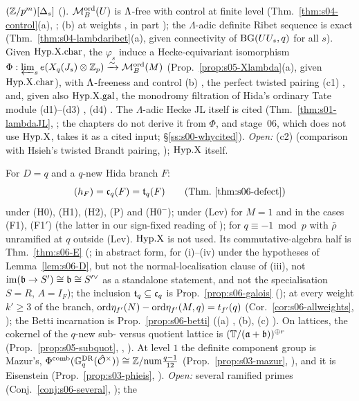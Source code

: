 \begin{description}[leftmargin=0pt,itemsep=4pt]
  $(\mathbb{Z}/p^m)[\Delta_s]$ (). $\mathcal{M}^{\mathrm{ord}}_B(U)$ is $\Lambda$-free with control at finite level
  (Thm.~\ref{thm:s04-control}(a), \stproved; (b) at weights \stcited, in part \stexp); the $\Lambda$-adic definite Ribet sequence is
  exact (Thm.~\ref{thm:s04-lambdaribet}(a), \stproved{} given connectivity of $\mathrm{BG}(UU_s,q)$ for all $s$). Given $\mathrm{Hyp.X.char}$, the
  $\varphi_s$ induce a Hecke-equivariant isomorphism $\Phi:\varprojlim_se(X_q(J_s)\otimes\mathbb{Z}_p)\xrightarrow\sim\mathcal{M}^{\mathrm{ord}}_B(M)$
  (Prop.~\ref{prop:s05-Xlambda}(a), \stproved{} given $\mathrm{Hyp.X.char}$), with $\Lambda$-freeness and control (b) \stpmc, the perfect twisted
  pairing (c1) \stpmc, and, given also $\mathrm{Hyp.X.gal}$, the monodromy filtration of Hida's ordinary Tate module (d1)--(d3) \stpmc, (d4)
  \stsketch. The $\Lambda$-adic Hecke JL itself is cited (Thm.~\ref{thm:s01-lambdaJL}, \stcited; the chapters do not derive it from
  $\Phi$, and stage~06, which does not use $\mathrm{Hyp.X}$, takes it as a cited input; \S\ref{ss:s00-whycited}).
  \emph{Open:} (c2) (comparison with Hsieh's twisted Brandt pairing, \stopen); $\mathrm{Hyp.X}$ itself.
\item[(d) Congruence modules.] For $D=q$ and a $q$-new Hida branch $F$:
  \[(h_F)=\mathfrak{c}_q(F)=\mathfrak{t}_q(F)\qquad\text{(Thm.~\ref{thm:s06-defect})}\]
  \stpmc{} under (H0), (H1), (H2), (P) and (H0$^-$); under (Lev) \stpmc{} for $M=1$ and in the cases (F1), (F1$'$) (the latter in our
  sign-fixed reading of \cite[Thm~3.14]{KO}); \stopen{} for $q\equiv-1\bmod p$ with $\bar\rho$ unramified at $q$ outside (Lev).
  $\mathrm{Hyp.X}$ is not used. Its commutative-algebra half is Thm.~\ref{thm:s06-E} (\stproved; \stformalized{} in abstract form, for (i)--(iv) under the hypotheses of Lemma~\ref{lem:s06-D}, but not the
  normal-localisation clause of (iii), not $\mathrm{im}(\mathfrak{b}\to S')\cong\mathfrak{b}\cong S'^\vee$ as a standalone statement, and not the specialisation
  $S=R$, $A=I_F$); the inclusion
  $\mathfrak{t}_q\subseteq\mathfrak{c}_q$ is Prop.~\ref{prop:s06-galois} (\stpmc); at every weight $k'\ge3$ of the branch,
  $\mathrm{ord}\eta_{f'}(N)-\mathrm{ord}\eta_{f'}(M,q)=t_{f'}(q)$ (Cor.~\ref{cor:s06-allweights}, \stpmc); the Betti incarnation is
  Prop.~\ref{prop:s06-betti} ((a) \stproved, (b), (c) \stpmc). On lattices, the cokernel of the $q$-new sub- versus quotient
  lattice is $(\mathbb{T}/(\mathfrak{a}+\mathfrak{b}))^{\oplus r}$ (Prop.~\ref{prop:s05-subquot}, \stproved, \stformal). At level $1$ the definite component
  group is Mazur's, $\Phi^{\mathrm{comb}}(\mathbb{G}^{\mathrm{DR}}_q(\hat{\mathcal{O}}^\times))\cong\mathbb{Z}/\mathrm{num}\frac{q-1}{12}$ (Prop.~\ref{prop:s03-mazur}, \stpmc), and it is
  Eisenstein (Prop.~\ref{prop:s03-phieis}, \stproved). \emph{Open:} several ramified primes (Conj.~\ref{conj:s06-several}, \stconj); the

\end{description}
